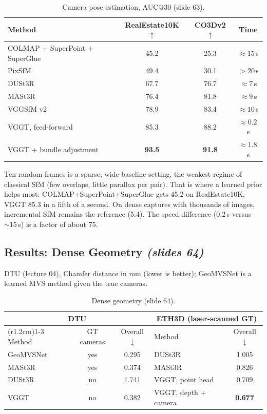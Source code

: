 \documentclass[11pt,a4paper]{article}
\newcommand{\slr}[1]{\texorpdfstring{\emph{(slides #1)}}{(slides #1)}}
\begin{document}
\begin{table}[H]
\centering
\begin{tabular}{lccc}
\toprule
Method & RealEstate10K $\uparrow$ & CO3Dv2 $\uparrow$ & Time\\
\midrule
COLMAP + SuperPoint + SuperGlue & 45.2 & 25.3 & $\approx15$\,s\\
PixSfM & 49.4 & 30.1 & $>20$\,s\\
DUSt3R & 67.7 & 76.7 & $\approx7$\,s\\
MASt3R & 76.4 & 81.8 & $\approx9$\,s\\
VGGSfM v2 & 78.9 & 83.4 & $\approx10$\,s\\
VGGT, feed-forward & 85.3 & 88.2 & $\approx0.2$\,s\\
VGGT + bundle adjustment & \textbf{93.5} & \textbf{91.8} & $\approx1.8$\,s\\
\bottomrule
\end{tabular}
\caption{Camera pose estimation, AUC@30 (slide 63).}
\end{table}

\begin{intuition}
Ten random frames is a sparse, wide-baseline setting, the weakest regime of classical SfM (few overlaps, little parallax per pair). That is where a learned prior helps most: COLMAP+SuperPoint+SuperGlue gets 45.2 on RealEstate10K, VGGT 85.3 in a fifth of a second. On dense captures with thousands of images, incremental SfM remains the reference (5.4). The speed difference ($0.2$\,s versus $\sim15$\,s) is a factor of about 75.
\end{intuition}

\subsection{Results: Dense Geometry \slr{64}}
DTU (lecture 04), Chamfer distance in mm (lower is better); GeoMVSNet is a learned MVS method given the true cameras.

\begin{table}[H]
\centering
\begin{tabular}{@{}lcc@{\hspace{2.2cm}}lc@{}}
\toprule
\multicolumn{3}{c}{DTU} & \multicolumn{2}{c}{ETH3D (laser-scanned GT)}\\
\cmidrule(r{1.2cm}){1-3}\cmidrule{4-5}
Method & GT cameras & Overall$\downarrow$ & Method & Overall$\downarrow$\\
\midrule
GeoMVSNet & yes & 0.295 & DUSt3R & 1.005\\
MASt3R & yes & 0.374 & MASt3R & 0.826\\
DUSt3R & no & 1.741 & VGGT, point head & 0.709\\
VGGT & no & 0.382 & VGGT, depth + camera & \textbf{0.677}\\
\bottomrule
\end{tabular}
\caption{Dense geometry (slide 64).}
\end{table}
\end{document}
